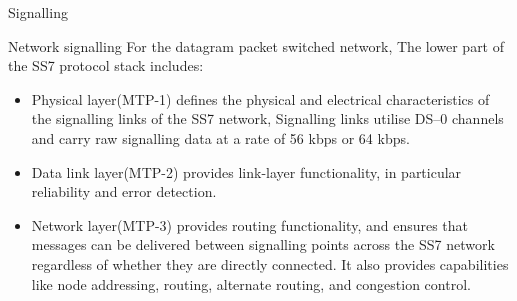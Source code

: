 \begin{section}{Signalling}
\begin{subsection}{Network signalling}
    For the datagram packet switched network, The lower part of the SS7 protocol stack includes:
    \begin{itemize}
      \item Physical layer(MTP-1) defines the physical and electrical characteristics of the
        signalling links of the SS7 network, Signalling links utilise DS–0 channels and carry raw
        signalling data at a rate of 56 kbps or 64 kbps.
      \item Data link layer(MTP-2) provides link-layer functionality, in particular reliability
        and error detection.
      \item Network layer(MTP-3) provides routing functionality, and ensures that messages can be
        delivered between signalling points across the SS7 network regardless of whether they are
        directly connected. It also provides capabilities like node addressing, routing, alternate
        routing, and congestion control.
    \end{itemize}


\end{subsection}
\end{section}

